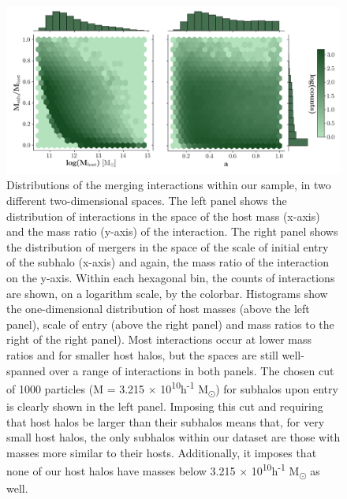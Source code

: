 \documentclass[fleqn,usenatbib]{mnras}
\begin{document}
\begin{figure}
	\includegraphics[width=\textwidth]{Figures/combined_distributions_logbin}
	\vspace{-20pt}
    \caption{Distributions of the merging interactions within our sample, in two different two-dimensional spaces. The left panel shows the distribution of interactions in the space of the host mass (x-axis) and the mass ratio (y-axis) of the interaction. The right panel shows the distribution of mergers in the space of the scale of initial entry of the subhalo (x-axis) and again, the mass ratio of the interaction on the y-axis. Within each hexagonal bin, the counts of interactions are shown, on a logarithm scale, by the colorbar. Histograms show the one-dimensional distribution of host masses (above the left panel), scale of entry (above the right panel) and mass ratios to the right of the right panel). Most interactions occur at lower mass ratios and for smaller host halos, but the spaces are still well-spanned over a range of interactions in both panels. The chosen cut of 1000 particles (M = 3.215 $\times$ 10\textsuperscript{10}h\textsuperscript{-1} M\textsubscript{\(\odot\)}) for subhalos upon entry is clearly shown in the left panel. Imposing this cut and requiring that host halos be larger than their subhalos means that, for very small host halos, the only subhalos within our dataset are those with masses more similar to their hosts. Additionally, it imposes that none of our host halos have masses below 3.215 $\times$ 10\textsuperscript{10}h\textsuperscript{-1} M\textsubscript{\(\odot\)} as well.}
    \label{fig:combined_distributions_logBin}
\end{figure}
\end{document}
